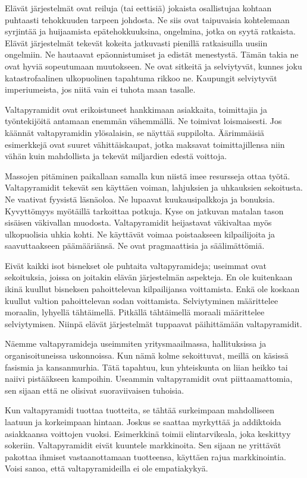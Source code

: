 Elävät järjestelmät ovat reiluja (tai eettisiä) jokaista osallistujaa kohtaan puhtaasti tehokkuuden tarpeen johdosta. Ne siis ovat taipuvaisia kohtelemaan syrjintää ja huijaamista epätehokkuuksina, ongelmina, jotka on syytä ratkaista. Elävät järjestelmät tekevät kokeita jatkuvasti pienillä ratkaisuilla uusiin ongelmiin. Ne hautaavat epäonnistumiset ja edistät menestystä. Tämän takia ne ovat hyviä sopeutumaan muutokseen. Ne ovat sitkeitä ja selviytyvät, kunnes joku katastrofaalinen ulkopuolinen tapahtuma rikkoo ne. Kaupungit selviytyvät imperiumeista, jos niitä vain ei tuhota maan tasalle.

Valtapyramidit ovat erikoistuneet hankkimaan asiakkaita, toimittajia ja työntekijöitä antamaan enemmän vähemmällä. Ne toimivat loismaisesti. Jos käännät valtapyramidin ylösalaisin, se näyttää suppilolta. Äärimmäisiä esimerkkejä ovat suuret vähittäiskaupat, jotka maksavat toimittajillensa niin vähän kuin mahdollista ja tekevät miljardien edestä voittoja.

Massojen pitäminen paikallaan samalla kun niistä imee resursseja ottaa työtä. Valtapyramidit tekevät sen käyttäen voiman, lahjuksien ja uhkauksien sekoitusta. Ne vaativat fyysistä läsnäoloa. Ne lupaavat kuukausipalkkoja ja bonuksia. Kyvyttömyys myötäillä tarkoittaa potkuja. Kyse on jatkuvan matalan tason sisäisen väkivallan muodosta. Valtapyramidit heijastavat väkivaltaa myös ulkopuolisia uhkia kohti. Ne käyttävät voimaa poistaakseen kilpailijoita ja saavuttaakseen päämääriänsä. Ne ovat pragmaattisia ja säälimättömiä.

Eivät kaikki isot bisnekset ole puhtaita valtapyramideja; useimmat ovat sekoituksia, joissa on joitakin elävän järjestelmän aspekteja. En ole kuitenkaan ikinä kuullut bisneksen pahoittelevan kilpailijansa voittamista. Enkä ole koskaan kuullut valtion pahoittelevan sodan voittamista. Selviytyminen määrittelee moraalin, lyhyellä tähtäimellä. Pitkällä tähtäimellä moraali määrittelee selviytymisen. Niinpä elävät järjestelmät tuppaavat päihittämään valtapyramidit.

Näemme valtapyramideja useimmiten yritysmaailmassa, hallituksissa ja organisoituneissa uskonnoissa. Kun nämä kolme sekoittuvat, meillä on käsissä fasismia ja kansanmurhia. Tätä tapahtuu, kun yhteiskunta on liian heikko tai naiivi pistääkseen kampoihin. Useammin valtapyramidit ovat piittaamattomia, sen sijaan että ne olisivat suoraviivaisen tuhoisia.

Kun valtapyramidi tuottaa tuotteita, se tähtää surkeimpaan mahdolliseen laatuun ja korkeimpaan hintaan. Joskus se saattaa myrkyttää ja addiktoida asiakkaansa voittojen vuoksi. Esimerkkinä toimii elintarvikeala, joka keskittyy sokeriin. Valtapyramidit eivät kuuntele markkinoita. Sen sijaan ne yrittävät pakottaa ihmiset vastaanottamaan tuotteensa, käyttäen rajua markkinointia. Voisi sanoa, että valtapyramideilla ei ole empatiakykyä.

